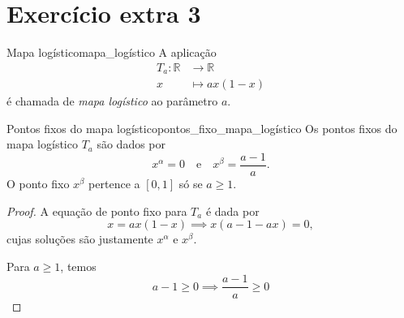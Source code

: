 \section*{Exercício extra 3}
\begin{definition}{Mapa logístico}{mapa_logístico}
    A aplicação
    \begin{align*}
        T_a : \mathbb{R} &\to \mathbb{R}\\
                       x &\mapsto ax(1 - x)
    \end{align*}
    é chamada de \emph{mapa logístico} ao parâmetro \(a\).
\end{definition}

\begin{proposition}{Pontos fixos do mapa logístico}{pontos_fixo_mapa_logístico}
    Os pontos fixos do mapa logístico \(T_a\) são dados por
    \begin{equation*}
        x^\alpha = 0 \quad\text{e}\quad x^\beta = \frac{a-1}{a}.
    \end{equation*}
    O ponto fixo \(x^\beta\) pertence a \([0,1]\) só se \(a \geq 1\).
\end{proposition}
\begin{proof}
    A equação de ponto fixo para \(T_a\) é dada por
    \begin{equation*}
        x = ax(1 - x) \implies x(a - 1 - ax) = 0,
    \end{equation*}
    cujas soluções são justamente \(x^\alpha\) e \(x^\beta\).

    Para \(a \geq 1\), temos
    \begin{equation*}
        a - 1 \geq 0 \implies \frac{a - 1}{a} \geq 0
    \end{equation*}
\end{proof}
